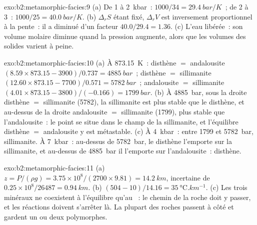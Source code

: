 \begin{solution}{exo:b2:metamorphic-facies:9}
(a) De 1 à \qty{2}{kbar}~: $1000/34 = \qty{29.4}{bar/K}$~; de 2 à 3~: $1000/25 =
\qty{40.0}{bar/K}$. (b) $\Delta_r S$ étant fixé, $\Delta_r V$ est inversement proportionnel à
la pente~: il a diminué d'un facteur $40.0/29.4 = 1.36$. (c) L'eau libérée~: son volume molaire
diminue quand la pression augmente, alors que les volumes des solides varient à peine.
\end{solution}

\begin{solution}{exo:b2:metamorphic-facies:10}
(a) À \qty{873.15}{K}~: disthène $=$ andalousite $(8.59\times873.15 - 3900)/0.737 =
\qty{4885}{bar}$~; disthène $=$ sillimanite $(12.60\times873.15 - 7700)/0.571 =
\qty{5782}{bar}$~; andalousite $=$ sillimanite $(4.01\times873.15 - 3800)/(-0.166) =
\qty{1799}{bar}$. (b) À \qty{4885}{bar}, sous la droite disthène $=$ sillimanite (5782),
la sillimanite est plus stable que le disthène, et au-dessus de la droite andalousite $=$ sillimanite
(1799), plus stable que l'andalousite~: le point se situe dans le champ de la sillimanite, et
l'équilibre disthène $=$ andalousite y est métastable. (c) À \qty{4}{kbar}~: entre 1799
et \qty{5782}{bar}, sillimanite. À \qty{7}{kbar}~: au-dessus de \qty{5782}{bar}, le disthène l'emporte sur la
sillimanite, et au-dessus de \qty{4885}{bar} il l'emporte sur l'andalousite~: disthène.
\end{solution}

\begin{solution}{exo:b2:metamorphic-facies:11}
(a) $z = P/(\rho g) = 3.75\times10^8/(2700\times9.81) = \qty{14.2}{km}$, incertaine de
$0.25\times10^8/26487 = \qty{0.94}{km}$. (b) $(504 - 10)/14.16 =
\qty{35}{\celsius.km^{-1}}$. (c) Les trois minéraux ne coexistent à l'équilibre qu'au
~: le chemin de la roche doit y passer, et les réactions doivent
s'arrêter là. La plupart des roches passent à côté et gardent un ou deux polymorphes.
\end{solution}

